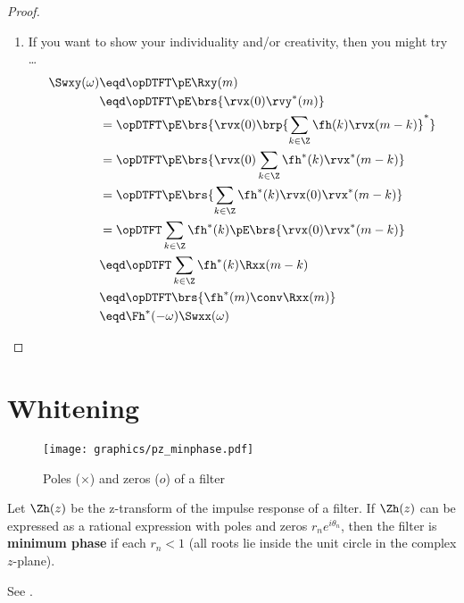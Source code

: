 \begin{proof}
\begin{enumerate}
\item If you want to show your individuality and/or creativity, then you might try \ldots
  \begin{align*}
    \Swxy(\omega)
      &\eqd \opDTFT\pE\Rxy(m)
    \\&\eqd \opDTFT\pE\brs{\rvx(0)\rvy^\ast(m)}
    \\&=    \opDTFT\pE\brs{\rvx(0)\brp{\sum_{k\in\Z} \fh(k)           \rvx(m-k)}^\ast}
    \\&=    \opDTFT\pE\brs{\rvx(0)     \sum_{k\in\Z} \fh^\ast(k)      \rvx^\ast(m-k)}
    \\&=    \opDTFT\pE\brs{            \sum_{k\in\Z} \fh^\ast(k)      \rvx(0)\rvx^\ast(m-k)}
    \\&=    \opDTFT                    \sum_{k\in\Z} \fh^\ast(k) \pE\brs{\rvx(0)\rvx^\ast(m-k)}
    \\&\eqd \opDTFT                    \sum_{k\in\Z} \fh^\ast(k) \Rxx(m-k)
    \\&\eqd \opDTFT                             \brs{\fh^\ast(m) \conv \Rxx(m)}
    \\&\eqd \Fh^\ast(-\omega) \Swxx(\omega)
  \end{align*}

\end{enumerate}
\end{proof}


\section{Whitening}
\label{sec:d-whiten}
\begin{figure}[h]
  \centering
  \texttt{[image: graphics/pz\_minphase.pdf]}
  \caption{
     Poles ($\times$) and zeros ($o$) of a  filter
     \label{fig:w_pz_minphase}
     }
\end{figure}
\begin{definition}
Let $\Zh(z)$ be the z-transform of the impulse response of a filter.
If $\Zh(z)$ can be expressed as a rational expression with poles and zeros
$r_ne^{i\theta_n}$,
then the filter is \textbf{minimum phase} if each $r_n<1$
(all roots lie inside the unit circle in the complex $z$-plane).
\end{definition}
See .

